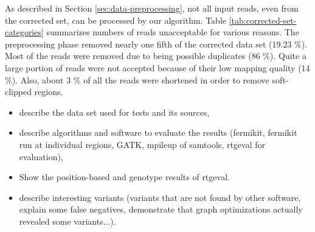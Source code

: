 As described in Section \ref{sec:data-preprocessing}, not all input reads, even from the corrected set, can be processed by our algorithm. Table \ref{tab:corrected-set-categories} summarizes numbers of reads unacceptable for various reasons. The preprocessing phase removed nearly one fifth of the corrected data set (19.23 \%). Most of the reads were removed due to being possible duplicates (86 \%). Quite a large portion of  reads were not accepted because of their low mapping quality (14 \%). Also, about 3 \% of all the reads were shortened in order to remove soft-clipped regions.

\begin{itemize}
\item describe the data set used for tests and its sources,
\item describe algorithms and software to evaluate the results (fermikit, fermikit run at individual regions, GATK, mpileup of samtools, rtgeval for evaluation),
\item Show the position-based and genotype results of rtgeval.
\item describe interesting variants (variants that are not found by other software, explain some false negatives, demonstrate that graph optimizations actually revealed some variants...).
\end{itemize}
